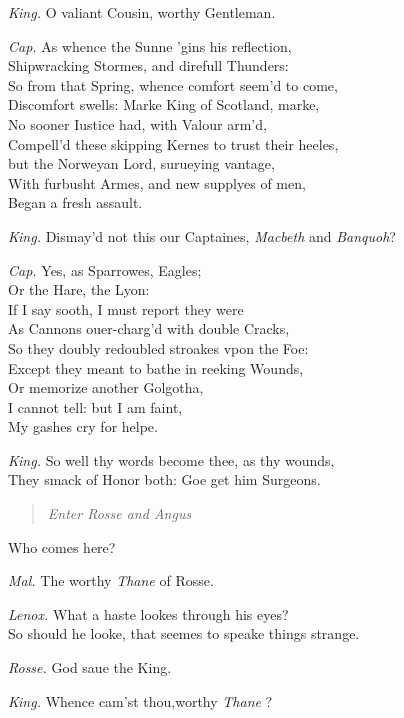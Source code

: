 \documentclass[12pt]{sides}
\newcommand{\StageDir}[1]{\begin{quote}\centering\em #1\end{quote}}
\newcommand{\dia}[1]{\hskip 15pt\textit{#1}\hskip 6pt}
\begin{document}
\begin{multicols}{2}
			\dia{King.} O valiant Cousin, worthy Gentleman.
			
			\dia{Cap.} As whence the Sunne 'gins his reflection, \\ Shipwracking Stormes, and direfull Thunders: \\ So from that Spring, whence comfort seem'd to come, \\ Discomfort swells: Marke King of Scotland, marke, \\ No sooner Iustice had, with Valour arm'd, \\ Compell'd these skipping Kernes to trust their heeles, \\ but the Norweyan Lord, surueying vantage, \\ With furbusht Armes, and new supplyes of men, \\ Began a fresh assault.
			
			\dia{King.} Dismay'd not this our Captaines, \textit{Macbeth} and \textit{Banquoh}?
			
			\dia{Cap.} Yes, as Sparrowes, Eagles; \\ Or the Hare, the Lyon: \\ If I say sooth, I must report they were \\ As Cannons ouer-charg'd with double Cracks, \\ So they doubly redoubled stroakes vpon the Foe: \\ Except they meant to bathe in reeking Wounds, \\ Or memorize another Golgotha, \\ I cannot tell: but I am faint, \\ My gashes cry for helpe.
			
			\dia{King.} So well thy words become thee, as thy wounds, \\ They smack of Honor both: Goe get him Surgeons.
			
			\StageDir{Enter Rosse and Angus} %
			Who comes here?
			
			\dia{Mal.} The worthy \textit{Thane} of Rosse.
			 
			\dia{Lenox.} What a haste lookes through his eyes? \\ So should he looke, that seemes to speake things strange.
			
			\dia{Rosse.} God saue the King.
			
			\dia{King.} Whence cam'st thou,worthy \textit{Thane} ?
			

\end{multicols}
\end{document}
